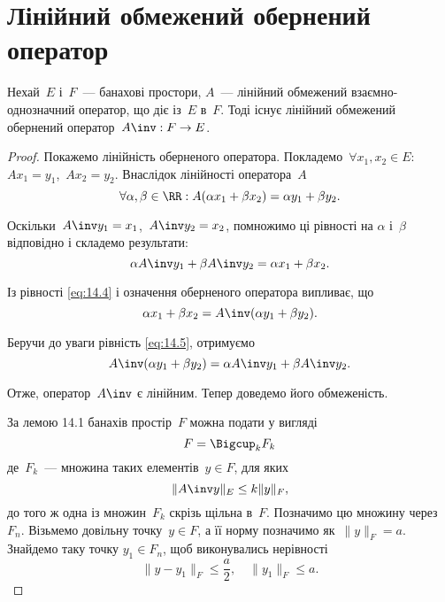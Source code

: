 \section{Лінійний обмежений обернений оператор}

\begin{theorem}
Нехай~$E$ і~$F$~--- банахові простори,
$A$~--- лінійний обмежений взаємно-однозначний оператор,
що діє із~$E$ в~$F$.
Тоді існує лінійний обмежений обернений
оператор~$A\inv: F \to E$.
\end{theorem}

\begin{proof}
Покажемо лінійність оберненого оператора.
Покладемо~$\forall x_1, x_2 \in E$: $A x_1 = y_1$,~$A x_2 = y_2$.
Внаслідок лінійності оператора~$A$
\begin{equation}
    \label{eq:14.4}
    \forall \alpha, \beta \in \RR:
    A(\alpha x_1 + \beta x_2) =
    \alpha y_1 + \beta y_2.
\end{equation}

Оскільки~$A\inv y_1 = x_1$,~$A\inv y_2 = x_2$, помножимо ці рівності на
$\alpha$ і~$\beta$ відповідно і складемо результати:
\begin{equation}
    \label{eq:14.5}
    \alpha A\inv y_1 + \beta A\inv y_2 =
    \alpha x_1 + \beta x_2.
\end{equation}

Із рівності \eqref{eq:14.4} і означення оберненого оператора випливає, що
\begin{equation*}
    \alpha x_1 + \beta x_2 = A\inv (\alpha y_1 + \beta y_2).
\end{equation*}

Беручи до уваги рівність \eqref{eq:14.5}, отримуємо
\begin{equation*}
    A\inv (\alpha y_1 + \beta y_2) = \alpha A\inv y_1 + \beta A\inv y_2.
\end{equation*}

Отже, оператор~$A\inv$ є лінійним. Тепер доведемо його обмеженість.

За лемою 14.1 банахів простір~$F$ можна подати у вигляді
\begin{equation*}
    F = \Bigcup_k F_k
\end{equation*}
де~$F_k$~--- множина таких елементів~$y \in F$, для яких
\begin{equation*}
    \|A\inv y\|_E \le k \|y\|_F,
\end{equation*}
до того ж одна із множин~$F_k$ скрізь щільна в~$F$. Позначимо
цю множину через~$F_n$. Візьмемо довільну точку~$y \in F$, а її
норму позначимо як~$\|y\|_F = a$. Знайдемо таку точку
$y_1 \in F_n$, щоб виконувались нерівності
\begin{equation*}
    \|y - y_1\|_F \le \frac{a}{2}, \quad \|y_1\|_F \le a.
\end{equation*}


\end{proof}
